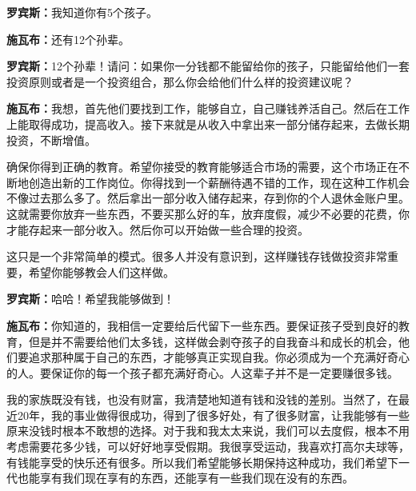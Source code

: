 \begin{BookQuote}
\textbf{罗宾斯：}我知道你有5个孩子。
\end{BookQuote}

\begin{BookQuote}
\textbf{施瓦布：}还有12个孙辈。
\end{BookQuote}

\begin{BookQuote}
\textbf{罗宾斯：}12个孙辈！请问：如果你一分钱都不能留给你的孩子，只能留给他们一套投资原则或者是一个投资组合，那么你会给他们什么样的投资建议呢？
\end{BookQuote}

\begin{BookQuote}
\textbf{施瓦布：}我想，首先他们要找到工作，能够自立，自己赚钱养活自己。然后在工作上能取得成功，提高收入。接下来就是从收入中拿出来一部分储存起来，去做长期投资，不断增值。
\end{BookQuote}

确保你得到正确的教育。希望你接受的教育能够适合市场的需要，这个市场正在不断地创造出新的工作岗位。你得找到一个薪酬待遇不错的工作，现在这种工作机会不像过去那么多了。然后拿出一部分收入储存起来，存到你的个人退休金账户里。这就需要你放弃一些东西，不要买那么好的车，放弃度假，减少不必要的花费，你才能存起来一部分收入。然后你可以开始做一些合理的投资。

这只是一个非常简单的模式。很多人并没有意识到，这样赚钱存钱做投资非常重要，希望你能够教会人们这样做。

\begin{BookQuote}
\textbf{罗宾斯：}哈哈！希望我能够做到！
\end{BookQuote}

\begin{BookQuote}
\textbf{施瓦布：}你知道的，我相信一定要给后代留下一些东西。要保证孩子受到良好的教育，但是并不需要给他们太多钱，这样做会剥夺孩子的自我奋斗和成长的机会，他们要追求那种属于自己的东西，才能够真正实现自我。你必须成为一个充满好奇心的人。要保证你的每一个孩子都充满好奇心。人这辈子并不是一定要赚很多钱。
\end{BookQuote}

我的家族既没有钱，也没有财富，我清楚地知道有钱和没钱的差别。当然了，在最近20年，我的事业做得很成功，得到了很多好处，有了很多财富，让我能够有一些原来没钱时根本不敢想的选择。对于我和我太太来说，我们可以去度假，根本不用考虑需要花多少钱，可以好好地享受假期。我很享受运动，我喜欢打高尔夫球等，有钱能享受的快乐还有很多。所以我们希望能够长期保持这种成功，我们希望下一代也能享有我们现在享有的东西，还能享有一些我们现在没有的东西。

